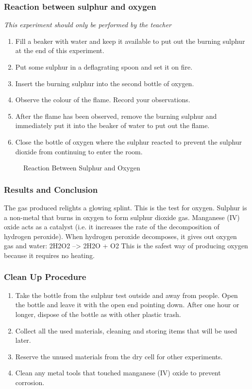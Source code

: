 \subsubsection*{Reaction between sulphur and oxygen}
\textit{This experiment should only be performed by the teacher}
\begin{enumerate}
\item{Fill a beaker with water and keep it available to put out the burning sulphur at the end of this experiment.}
\item{Put some sulphur in a deflagrating spoon and set it on fire.}
\item{Insert the burning sulphur into the second bottle of oxygen.}
\item{Observe the colour of the flame. Record your observations.}
\item{After the flame has been observed, remove the burning sulphur and immediately put it into the beaker of water to put out the flame.}
\item{Close the bottle of oxygen where the sulphur reacted to prevent the sulphur dioxide from continuing to enter the room.}
\end{enumerate}
\begin{figure}[h]
\begin{center}
\caption{Reaction Between Sulphur and Oxygen}
\label{fig:sulphur_and_oxygen}
\end{center}
\end{figure}

\subsubsection*{Results and Conclusion}
The gas produced relights a glowing splint. This is the test for oxygen. Sulphur is a non-metal that burns in oxygen to form sulphur dioxide gas. Manganese (IV) oxide acts as a catalyst (i.e. it increases the rate of the decomposition of hydrogen peroxide). When hydrogen peroxide decomposes, it gives out oxygen gas and water:
2H2O2 --> 2H2O + O2
This is the safest way of producing oxygen because it requires no heating.

\subsubsection*{Clean Up Procedure}
\begin{enumerate}
\item{Take the bottle from the sulphur test outside and away from people. Open the bottle and leave it with the open end pointing down. After one hour or longer, dispose of the bottle as with other plastic trash.}
\item{Collect all the used materials, cleaning and storing items that will be used later.}
\item{Reserve the unused materials from the dry cell for other experiments.}
\item{Clean any metal tools that touched manganese (IV) oxide to prevent corrosion.}
\end{enumerate}

